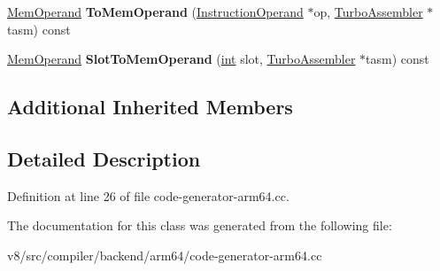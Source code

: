 \begin{DoxyCompactItemize}
\item 
\mbox{\label{classv8_1_1internal_1_1compiler_1_1Arm64OperandConverter_a5bb8abc51390c8dc5647359444c4f457}} 
\mbox{\hyperlink{classv8_1_1internal_1_1MemOperand}{Mem\+Operand}} {\bfseries To\+Mem\+Operand} (\mbox{\hyperlink{classv8_1_1internal_1_1compiler_1_1InstructionOperand}{Instruction\+Operand}} $\ast$op, \mbox{\hyperlink{classv8_1_1internal_1_1TurboAssembler}{Turbo\+Assembler}} $\ast$tasm) const
\item 
\mbox{\label{classv8_1_1internal_1_1compiler_1_1Arm64OperandConverter_a6815c126c0e7c8f4c180686ac12e2f26}} 
\mbox{\hyperlink{classv8_1_1internal_1_1MemOperand}{Mem\+Operand}} {\bfseries Slot\+To\+Mem\+Operand} (\mbox{\hyperlink{classint}{int}} slot, \mbox{\hyperlink{classv8_1_1internal_1_1TurboAssembler}{Turbo\+Assembler}} $\ast$tasm) const
\end{DoxyCompactItemize}
\subsection*{Additional Inherited Members}


\subsection{Detailed Description}


Definition at line 26 of file code-\/generator-\/arm64.\+cc.



The documentation for this class was generated from the following file\+:\begin{DoxyCompactItemize}
\item 
v8/src/compiler/backend/arm64/code-\/generator-\/arm64.\+cc\end{DoxyCompactItemize}
